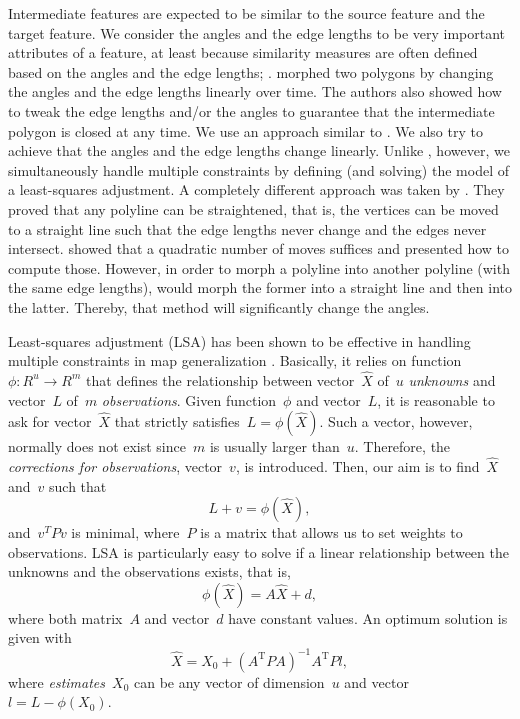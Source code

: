 Intermediate features are expected to be similar to 
the source feature and the target feature. 
We consider the angles and the edge lengths 
to be very important attributes of a feature, 
at least because similarity measures are often defined 
based on the angles and the edge lengths; 
\parencite[e.g.,][]{Arkin1991,Latecki2000,Frank2006}. 
\textcite{Sederberg1993} morphed two polygons by 
changing the angles and the edge lengths linearly over time. 
The authors also showed how to tweak 
the edge lengths and/or the angles to guarantee that
the intermediate polygon is closed at any time. 
We use an approach similar to \textcite{Sederberg1993}. 
We also try to achieve that 
the angles and the edge lengths change linearly. 
Unlike \textcite{Sederberg1993}, however, 
we simultaneously handle multiple constraints 
by defining (and solving) the model of a 
least-squares adjustment. 
A completely different approach was 
taken by \textcite{Connelly2003}. 
They proved that any polyline can be straightened, that is,
the vertices can be moved to a straight line 
such that the edge lengths never change and 
the edges never intersect. 
\textcite{Streinu2000} showed that 
a quadratic number of moves suffices 
and presented how to compute those. 
However, in order to morph a polyline into another polyline 
(with the same edge lengths), 
\textcite{Streinu2000} would morph the former
into a straight line and then into the latter. 
Thereby, that method will significantly change the angles.

Least-squares adjustment (LSA) has been shown to be effective 
in handling multiple constraints in map generalization
\parencite{Sester2000,Harrie2002}. 
Basically, it relies on 
function~$\phi: R^u \rightarrow R^m$ 
that defines the relationship between
vector~$\hat{X}$ of~$u$ \emph{unknowns} and 
vector~$L$ of~$m$ \emph{observations}. 
Given function~$\phi$ and vector~$L$, 
it is reasonable to ask for 
vector~$\hat{X}$ that strictly satisfies~$L=\phi(\hat{X})$. 
Such a vector, however, 
normally does not exist since~$m$ is usually larger than~$u$. 
Therefore, the \emph{corrections for observations}, 
vector~$v$, is introduced. 
Then, our aim is to find~$\hat{X}$ and~$v$ such that
\begin{equation}
L+v= \phi(\hat{X}), \nonumber
\end{equation}
and~$v^T P v$ is minimal, 
where~$P$ is a matrix 
that allows us to set weights to observations.
LSA is particularly easy to solve 
if a linear relationship between the unknowns 
and the observations exists, that is,
\begin{equation}
\label{eq:Morph_Relationship}
\phi(\hat{X})=A\hat{X}+d,
\end{equation}
where both matrix~$A$ and vector~$d$ have constant values. 
An optimum solution is given with
\begin{equation}
\label{eq:Morph_Solution}
\hat{X}=X_0+ (A^\mathrm{T}PA)^{-1}A^\mathrm{T}Pl,
\end{equation}
where \emph{estimates}~$X_0$ can be 
any vector of dimension~$u$ and vector~$l=L- \phi(X_0)$.


